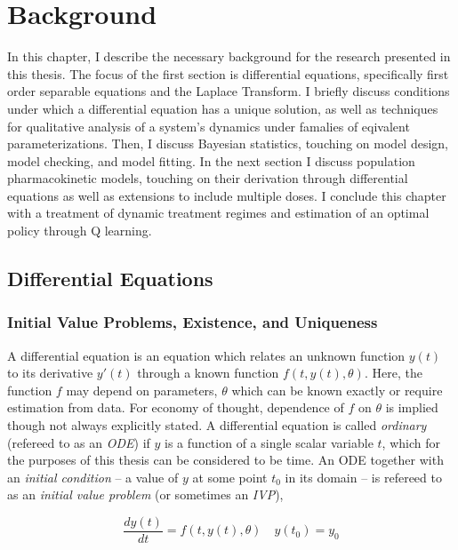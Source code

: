 \chapter{Background}

In this chapter, I describe the necessary background for the research presented in this thesis.  The focus of the first section is differential equations, specifically first order separable equations and the Laplace Transform.  I briefly discuss conditions under which a differential equation has a unique solution, as well as techniques for qualitative analysis of a system's dynamics under famalies of eqivalent parameterizations.  Then, I discuss Bayesian statistics, touching on model design, model checking, and model fitting.  In the next section I discuss population pharmacokinetic models, touching on their derivation through differential equations as well as extensions to include multiple doses.  I conclude this chapter with a treatment of dynamic treatment regimes and estimation of an optimal policy through Q learning.

\section{Differential Equations}\label{sec:ODE}

\subsection{Initial Value Problems, Existence, and Uniqueness}

A differential equation is an equation which relates an unknown function $y(t)$ to its derivative $y'(t)$ through a known function $f(t, y(t), \theta)$. Here, the function $f$ may depend on parameters, $\theta$ which can be known exactly or require estimation from data. For economy of thought, dependence of $f$ on $\theta$ is implied though not always explicitly stated. A differential equation is called \textit{ordinary} (refereed to as an \textit{ODE}) if $y$ is a function of a single scalar variable $t$, which for the purposes of this thesis can be considered to be time. An ODE together with an \textit{initial condition} -- a value of $y$ at some point $t_0$ in its domain --  is refereed to as an \textit{initial value problem} (or sometimes an \textit{IVP}), 

\begin{equation}\label{IVP}
	\dfrac{dy(t)}{dt} = f(t, y(t), \theta) \quad y(t_0) = y_0
\end{equation}

